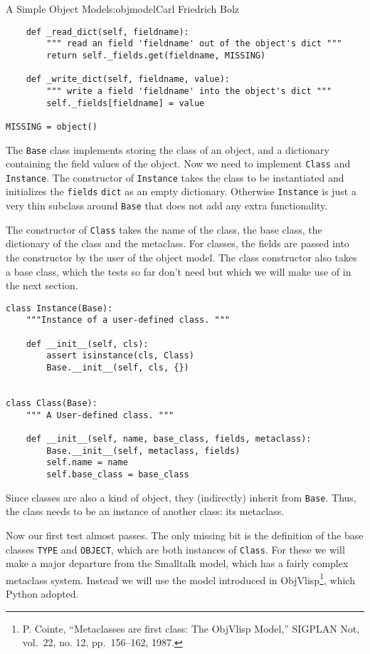 \begin{aosachapter}{A Simple Object Model}{s:objmodel}{Carl Friedrich Bolz}
\begin{verbatim}
    def _read_dict(self, fieldname):
        """ read an field 'fieldname' out of the object's dict """
        return self._fields.get(fieldname, MISSING)

    def _write_dict(self, fieldname, value):
        """ write a field 'fieldname' into the object's dict """
        self._fields[fieldname] = value

MISSING = object()
\end{verbatim}

The \texttt{Base} class implements storing the class of an object, and a
dictionary containing the field values of the object. Now we need to
implement \texttt{Class} and \texttt{Instance}. The constructor of
\texttt{Instance} takes the class to be instantiated and initializes the
\texttt{fields} \texttt{dict} as an empty dictionary. Otherwise
\texttt{Instance} is just a very thin subclass around \texttt{Base} that
does not add any extra functionality.

The constructor of \texttt{Class} takes the name of the class, the base
class, the dictionary of the class and the metaclass. For classes, the
fields are passed into the constructor by the user of the object model.
The class constructor also takes a base class, which the tests so far
don't need but which we will make use of in the next section.

\begin{verbatim}
class Instance(Base):
    """Instance of a user-defined class. """

    def __init__(self, cls):
        assert isinstance(cls, Class)
        Base.__init__(self, cls, {})


class Class(Base):
    """ A User-defined class. """

    def __init__(self, name, base_class, fields, metaclass):
        Base.__init__(self, metaclass, fields)
        self.name = name
        self.base_class = base_class
\end{verbatim}

Since classes are also a kind of object, they (indirectly) inherit from
\texttt{Base}. Thus, the class needs to be an instance of another class:
its metaclass.

Now our first test almost passes. The only missing bit is the definition
of the base classes \texttt{TYPE} and \texttt{OBJECT}, which are both
instances of \texttt{Class}. For these we will make a major departure
from the Smalltalk model, which has a fairly complex metaclass system.
Instead we will use the model introduced in ObjVlisp\footnote{P. Cointe,
  ``Metaclasses are first class: The ObjVlisp Model,'' SIGPLAN Not,
  vol.~22, no. 12, pp.~156--162, 1987.}, which Python adopted.


\end{aosachapter}
